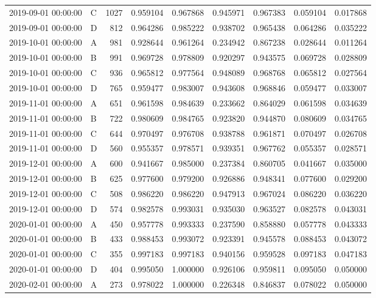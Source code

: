 \begin{tabular}{llrrrrrrr}
2019-09-01 00:00:00 & C & 1027 & 0.959104 & 0.967868 & 0.945971 & 0.967383 & 0.059104 & 0.017868 \\
2019-09-01 00:00:00 & D & 812 & 0.964286 & 0.985222 & 0.938702 & 0.965438 & 0.064286 & 0.035222 \\
2019-10-01 00:00:00 & A & 981 & 0.928644 & 0.961264 & 0.234942 & 0.867238 & 0.028644 & 0.011264 \\
2019-10-01 00:00:00 & B & 991 & 0.969728 & 0.978809 & 0.920297 & 0.943575 & 0.069728 & 0.028809 \\
2019-10-01 00:00:00 & C & 936 & 0.965812 & 0.977564 & 0.948089 & 0.968768 & 0.065812 & 0.027564 \\
2019-10-01 00:00:00 & D & 765 & 0.959477 & 0.983007 & 0.943608 & 0.968846 & 0.059477 & 0.033007 \\
2019-11-01 00:00:00 & A & 651 & 0.961598 & 0.984639 & 0.233662 & 0.864029 & 0.061598 & 0.034639 \\
2019-11-01 00:00:00 & B & 722 & 0.980609 & 0.984765 & 0.923820 & 0.944870 & 0.080609 & 0.034765 \\
2019-11-01 00:00:00 & C & 644 & 0.970497 & 0.976708 & 0.938788 & 0.961871 & 0.070497 & 0.026708 \\
2019-11-01 00:00:00 & D & 560 & 0.955357 & 0.978571 & 0.939351 & 0.967762 & 0.055357 & 0.028571 \\
2019-12-01 00:00:00 & A & 600 & 0.941667 & 0.985000 & 0.237384 & 0.860705 & 0.041667 & 0.035000 \\
2019-12-01 00:00:00 & B & 625 & 0.977600 & 0.979200 & 0.926886 & 0.948341 & 0.077600 & 0.029200 \\
2019-12-01 00:00:00 & C & 508 & 0.986220 & 0.986220 & 0.947913 & 0.967024 & 0.086220 & 0.036220 \\
2019-12-01 00:00:00 & D & 574 & 0.982578 & 0.993031 & 0.935030 & 0.963527 & 0.082578 & 0.043031 \\
2020-01-01 00:00:00 & A & 450 & 0.957778 & 0.993333 & 0.237590 & 0.858880 & 0.057778 & 0.043333 \\
2020-01-01 00:00:00 & B & 433 & 0.988453 & 0.993072 & 0.923391 & 0.945578 & 0.088453 & 0.043072 \\
2020-01-01 00:00:00 & C & 355 & 0.997183 & 0.997183 & 0.940156 & 0.959528 & 0.097183 & 0.047183 \\
2020-01-01 00:00:00 & D & 404 & 0.995050 & 1.000000 & 0.926106 & 0.959811 & 0.095050 & 0.050000 \\
2020-02-01 00:00:00 & A & 273 & 0.978022 & 1.000000 & 0.226348 & 0.846837 & 0.078022 & 0.050000 \\

\end{tabular}
